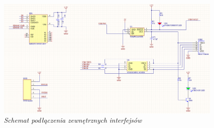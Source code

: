 \documentclass[eng,printmode]{mgr}
\begin{document}
\begin{figure}[!h]
    \centering
    \includegraphics[width=\textwidth]{schematics/conn.png}
    \caption{\textit{Schemat podłączenia zewnętrznych interfejsów}}
\end{figure}
\end{document}
